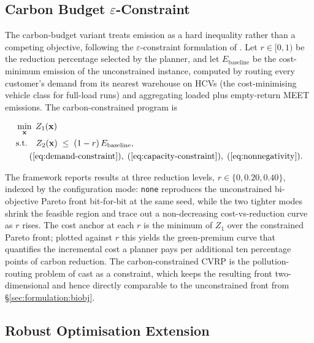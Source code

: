 \documentclass[review,preprint,authoryear,12pt]{elsarticle}
\begin{document}
\subsection{Carbon Budget $\varepsilon$-Constraint}
\label{sec:formulation:carbonbudget}

The carbon-budget variant treats emission as a hard inequality
rather than a competing objective, following the
$\varepsilon$-constraint formulation of \citet[\S3]{bektas2011prp}.
Let $r \in [0, 1)$ be the reduction percentage selected by the
planner, and let $E_{\mathrm{baseline}}$ be the cost-minimum emission
of the unconstrained instance, computed by routing every customer's
demand from its nearest warehouse on HCVs (the cost-minimising
vehicle class for full-load runs) and aggregating loaded plus
empty-return MEET emissions. The carbon-constrained program is

\begin{equation}
\begin{aligned}
& \min_{\mathbf{x}} \; Z_1(\mathbf{x}) \\
& \text{s.t.} \quad
Z_2(\mathbf{x}) \;\leq\; (1 - r) \, E_{\mathrm{baseline}}, \\
& \quad\;\;
(\ref{eq:demand-constraint}), \;
(\ref{eq:capacity-constraint}), \;
(\ref{eq:nonnegativity}).
\end{aligned}
\label{eq:carbon-budget}
\end{equation}

The framework reports results at three reduction levels,
$r \in \{0, 0.20, 0.40\}$, indexed by the configuration mode:
\texttt{none} reproduces the unconstrained bi-objective Pareto front
bit-for-bit at the same seed, while the two tighter modes shrink the
feasible region and trace out a non-decreasing cost-vs-reduction
curve as $r$ rises. The cost anchor at each $r$ is the minimum of
$Z_1$ over the constrained Pareto front; plotted against $r$ this
yields the green-premium curve that quantifies the incremental cost a
planner pays per additional ten percentage points of carbon
reduction. The carbon-constrained CVRP is the pollution-routing
problem of \citet{bektas2011prp} cast as a constraint, which keeps
the resulting front two-dimensional and hence directly comparable to
the unconstrained front from \S\ref{sec:formulation:biobj}.

\subsection{Robust Optimisation Extension}
\label{sec:formulation:robust}
\end{document}
